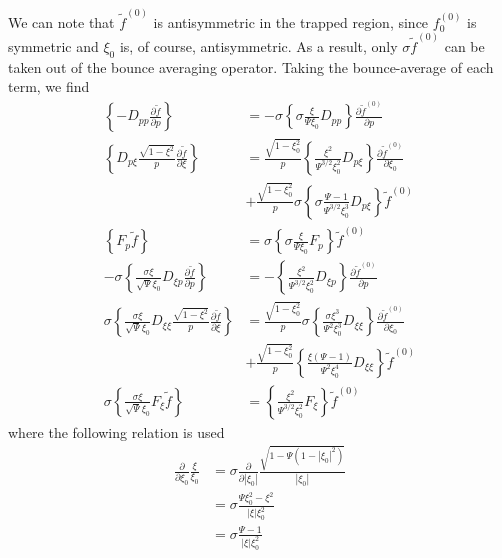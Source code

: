 We can note that $\widetilde{f}^{(0)}$ is antisymmetric in the trapped region,
since $f_{0}^{(0)}$ is symmetric and $\xi_{0}$ is, of course, antisymmetric.
As a result, only $\sigma\widetilde{f}^{(0)}$ can be taken out of the bounce
averaging operator. Taking the bounce-average of each term, we find
\begin{align}
\left\{  -D_{pp}\frac{\partial\widetilde{f}}{\partial p}\right\}   &
=-\sigma\left\{  \sigma\frac{\xi}{\Psi\xi_{0}}D_{pp}\right\}  \frac
{\partial\widetilde{f}^{(0)}}{\partial p}\\
\left\{  D_{p\xi}\frac{\sqrt{1-\xi^{2}}}{p}\frac{\partial\widetilde{f}%
}{\partial\xi}\right\}   &  =\frac{\sqrt{1-\xi_{0}^{2}}}{p}\left\{  \frac
{\xi^{2}}{\Psi^{3/2}\xi_{0}^{2}}D_{p\xi}\right\}  \frac{\partial\widetilde
{f}^{(0)}}{\partial\xi_{0}}\nonumber\\
&  +\frac{\sqrt{1-\xi_{0}^{2}}}{p}\sigma\left\{  \sigma\frac{\Psi-1}%
{\Psi^{3/2}\xi_{0}^{3}}D_{p\xi}\right\}  \widetilde{f}^{(0)}\\
\left\{  F_{p}\widetilde{f}\right\}   &  =\sigma\left\{  \sigma\frac{\xi}%
{\Psi\xi_{0}}F_{p}\right\}  \widetilde{f}^{(0)}\\
-\sigma\left\{  \frac{\sigma\xi}{\sqrt{\Psi}\xi_{0}}D_{\xi p}\frac
{\partial\widetilde{f}}{\partial p}\right\}   &  =-\left\{  \frac{\xi^{2}%
}{\Psi^{3/2}\xi_{0}^{2}}D_{\xi p}\right\}  \frac{\partial\widetilde{f}^{(0)}%
}{\partial p}\\
\sigma\left\{  \frac{\sigma\xi}{\sqrt{\Psi}\xi_{0}}D_{\xi\xi}\frac{\sqrt
{1-\xi^{2}}}{p}\frac{\partial\widetilde{f}}{\partial\xi}\right\}   &
=\frac{\sqrt{1-\xi_{0}^{2}}}{p}\sigma\left\{  \frac{\sigma\xi^{3}}{\Psi^{2}%
\xi_{0}^{3}}D_{\xi\xi}\right\}  \frac{\partial\widetilde{f}^{(0)}}{\partial
\xi_{0}}\nonumber\\
&  +\frac{\sqrt{1-\xi_{0}^{2}}}{p}\left\{  \frac{\xi\left(  \Psi-1\right)
}{\Psi^{2}\xi_{0}^{4}}D_{\xi\xi}\right\}  \widetilde{f}^{(0)}\\
\sigma\left\{  \frac{\sigma\xi}{\sqrt{\Psi}\xi_{0}}F_{\xi}\widetilde
{f}\right\}   &  =\left\{  \frac{\xi^{2}}{\Psi^{3/2}\xi_{0}^{2}}F_{\xi
}\right\}  \widetilde{f}^{(0)}%
\end{align}
where the following relation is used
\begin{align}
\frac{\partial}{\partial\xi_{0}}\frac{\xi}{\xi_{0}} &  =\sigma\frac{\partial
}{\partial\left|  \xi_{0}\right|  }\frac{\sqrt{1-\Psi\left(  1-\left|  \xi
_{0}\right|  ^{2}\right)  }}{\left|  \xi_{0}\right|  }\nonumber\\
&  =\sigma\frac{\Psi\xi_{0}^{2}-\xi^{2}}{\left|  \xi\right|  \xi_{0}^{2}%
}\nonumber\\
&  =\sigma\frac{\Psi-1}{\left|  \xi\right|  \xi_{0}^{2}}%
\end{align}


